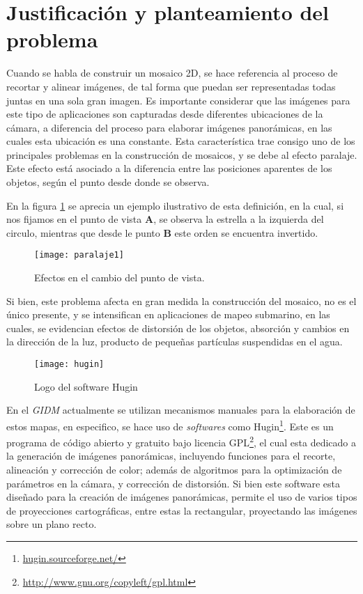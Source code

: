 \section{Justificación y planteamiento del problema}


Cuando se habla de construir un mosaico 2D, se hace referencia al proceso de recortar y alinear imágenes, de tal forma que puedan ser representadas todas juntas en una sola gran imagen. Es importante considerar que las imágenes para este tipo de aplicaciones son capturadas desde diferentes ubicaciones de la cámara, a diferencia del proceso para elaborar imágenes panorámicas, en las cuales esta ubicación es una constante. Esta característica trae consigo uno de los principales problemas en la construcción de mosaicos, y se debe al efecto paralaje. Este efecto está asociado a la diferencia entre las posiciones aparentes de los objetos, según el punto desde donde se observa.

En la figura \ref{imagen:paralaje} se aprecia un ejemplo ilustrativo de esta definición, en la cual, si nos fijamos en el punto de vista \textbf{A}, se observa la estrella a la izquierda del circulo, mientras que desde le punto \textbf{B} este orden se encuentra invertido. 

\begin{figure}[H]
	\centering
	\texttt{[image: paralaje1]}
	\caption[Efectos en el cambio del punto de vista]{Efectos en el cambio del punto de vista.}
	\label{imagen:paralaje}
\end{figure}

Si bien, este problema afecta en gran medida la construcción del mosaico, no es el único presente, y se intensifican en aplicaciones de mapeo submarino, en las cuales, se evidencian efectos de distorsión de los objetos, absorción y cambios en la dirección de la luz, producto de pequeñas partículas suspendidas en el agua.

\begin{wrapfigure}{r}{0.3\textwidth}
	\begin{center}
		\texttt{[image: hugin]}
	\end{center}
	\caption{Logo del software Hugin}
\end{wrapfigure}

En el \textit{GIDM} actualmente se utilizan mecanismos manuales para la elaboración de estos mapas, en especifico, se hace uso de \textit{softwares} como Hugin\footnote{\url{hugin.sourceforge.net/}}. Este es un programa de código abierto y gratuito bajo licencia GPL\footnote{ \url{http://www.gnu.org/copyleft/gpl.html}}, el cual esta dedicado a la generación de imágenes panorámicas, incluyendo funciones para el recorte, alineación y corrección de color; además de algoritmos para la optimización de parámetros en la cámara, y corrección de distorsión. Si bien este software esta diseñado para la creación de imágenes panorámicas, permite el uso de varios tipos de proyecciones cartográficas, entre estas la rectangular, proyectando las imágenes sobre un plano recto. 

